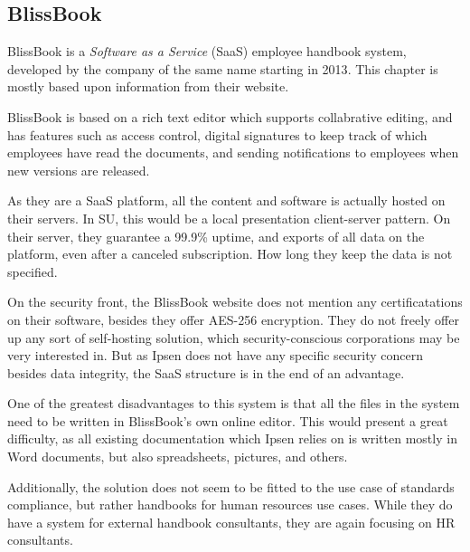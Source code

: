 \subsection{BlissBook}
BlissBook is a \textit{Software as a Service} (SaaS) employee handbook system, developed by the company of the same name starting in 2013\cite{BlissbookInfo}.
This chapter is mostly based upon information from their website\cite{BlissbookContents}.

BlissBook is based on a rich text editor which supports collabrative editing, and has features such as access control, digital signatures to keep track of which employees have read the documents, and sending notifications to employees when new versions are released.

As they are a SaaS platform, all the content and software is actually hosted on their servers.
In SU, this would be a local presentation client-server pattern. %
On their server, they guarantee a 99.9\% uptime, and exports of all data on the platform, even after a canceled subscription.
How long they keep the data is not specified.

On the security front, the BlissBook website does not mention any certificatations on their software, besides they offer AES-256 encryption.\cite{BlissbookSecurity}
They do not freely offer up any sort of self-hosting solution, which security-conscious corporations may be very interested in.
But as Ipsen does not have any specific security concern besides data integrity, the SaaS structure is in the end of an advantage.

One of the greatest disadvantages to this system is that all the files in the system need to be written in BlissBook's own online editor.
This would present a great difficulty, as all existing documentation which Ipsen relies on is written mostly in Word documents, but also spreadsheets, pictures, and others.

Additionally, the solution does not seem to be fitted to the use case of standards compliance, but rather handbooks for human resources use cases.
While they do have a system for external handbook consultants, they are again focusing on HR consultants.\cite{BlissbookHandbook}
